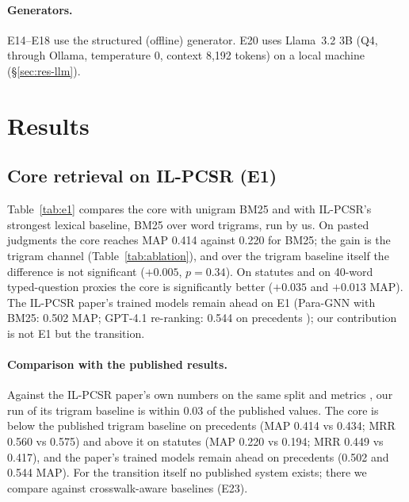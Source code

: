 \documentclass[sigconf,nonacm]{acmart}
\begin{document}
\paragraph{Generators.} E14--E18 use the structured (offline) generator. E20 uses Llama~3.2 3B
(Q4, through Ollama, temperature 0, context 8,192 tokens) on a local machine (\S\ref{sec:res-llm}).

\section{Results}\label{sec:results}

\subsection{Core retrieval on IL-PCSR (E1)}

Table~\ref{tab:e1} compares the core with unigram BM25 and with IL-PCSR's strongest lexical
baseline, BM25 over word trigrams, run by us. On pasted judgments the core reaches MAP 0.414 against
0.220 for BM25; the gain is the trigram channel (Table~\ref{tab:ablation}), and over the trigram
baseline itself the difference is not significant ($+0.005$, $p=0.34$). On statutes and on
40-word typed-question proxies the core is significantly better ($+0.035$ and $+0.013$ MAP). The
IL-PCSR paper's trained models remain ahead on E1 (Para-GNN with BM25: 0.502 MAP; GPT-4.1
re-ranking: 0.544 on precedents \cite{ilpcsr}); our contribution is not E1 but the transition.

\paragraph{Comparison with the published results.} Against the IL-PCSR paper's own numbers on the
same split and metrics \cite{ilpcsr}, our run of its trigram baseline is within 0.03 of the
published values. The core is below the published trigram baseline on precedents (MAP 0.414 vs
0.434; MRR 0.560 vs 0.575) and above it on statutes (MAP 0.220 vs 0.194; MRR 0.449 vs 0.417), and
the paper's trained models remain ahead on precedents (0.502 and 0.544 MAP). For the transition
itself no published system exists; there we compare against crosswalk-aware baselines (E23).
\end{document}
